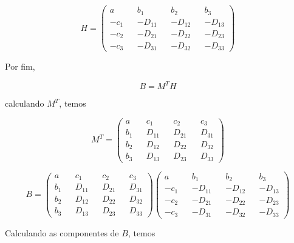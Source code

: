 \documentclass[10pt,a4paper]{article}
\begin{document}
\begin{enumerate}
$$H = 	\left(\begin{matrix}
	a && b_1 && b_2 && b_3 \\
	-c_1 && -D_{11} && -D_{12} && -D_{13} \\
	-c_2 && -D_{21} && -D_{22} && -D_{23}\\
	-c_3 && -D_{31} && -D_{32} && -D_{33}
\end{matrix}\right)$$
\end{enumerate}
Por fim,

$$B = M^{T}H$$

calculando $ M^{T} $, temos

\begin{equation}\nonumber
	M^{T} = \left(\begin{matrix}
	a && c_1 && c_2 && c_3 \\
	b_1 && D_{11} && D_{21} && D_{31}\\
	b_2 && D_{12} && D_{22} && D_{32} \\
	b_3 && D_{13} && D_{23} && D_{33}
	\end{matrix}\right) 
\end{equation}

\begin{equation}\nonumber
	B = \left(\begin{matrix}
	a && c_1 && c_2 && c_3 \\
	b_1 && D_{11} && D_{21} && D_{31}\\
	b_2 && D_{12} && D_{22} && D_{32} \\
	b_3 && D_{13} && D_{23} && D_{33}
\end{matrix}\right) \left(\begin{matrix}
a && b_1 && b_2 && b_3 \\
-c_1 && -D_{11} && -D_{12} && -D_{13} \\
-c_2 && -D_{21} && -D_{22} && -D_{23}\\
-c_3 && -D_{31} && -D_{32} && -D_{33}
\end{matrix}\right)
\end{equation}

Calculando as componentes de $ B $, temos
\end{document}
